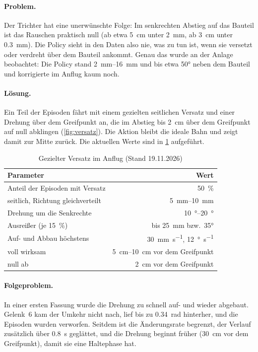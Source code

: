 \paragraph{Problem.} Der Trichter hat eine unerwünschte Folge: Im senkrechten Abstieg auf das
Bauteil ist das Rauschen praktisch null (ab etwa \SI{5}{\centi\metre} unter
\SI{2}{\milli\metre}, ab \SI{3}{\centi\metre} unter \SI{0.3}{\milli\metre}). Die Policy sieht
in den Daten also nie, was zu tun ist, wenn sie versetzt oder verdreht über dem Bauteil
ankommt. Genau das wurde an der Anlage beobachtet: Die Policy stand \SIrange{2}{16}{\milli\metre}
und bis etwa \ang{50} neben dem Bauteil und korrigierte im Anflug kaum noch.

\paragraph{Lösung.} Ein Teil der Episoden fährt mit einem gezielten seitlichen Versatz und
einer Drehung über dem Greifpunkt an, die im Abstieg bis \SI{2}{\centi\metre} über dem
Greifpunkt auf null abklingen (\cref{fig:versatz}). Die Aktion bleibt die ideale Bahn und
zeigt damit zur Mitte zurück. Die aktuellen Werte sind in \cref{tab:versatz} aufgeführt.

\begin{table}[htbp]
  \centering
  \caption[Gezielter Versatz im Anflug]{Gezielter Versatz im Anflug (Stand 19.11.2026)}
  \label{tab:versatz}
  \begin{tabular}{@{}l r@{}}
    \toprule
    Parameter & Wert \\
    \midrule
    Anteil der Episoden mit Versatz & \SI{50}{\percent} \\
    seitlich, Richtung gleichverteilt & \SIrange{5}{10}{\milli\metre} \\
    Drehung um die Senkrechte & \SIrange{10}{20}{\degree} \\
    Ausreißer (je \SI{15}{\percent}) & bis \SI{25}{\milli\metre} bzw.\ \ang{35} \\
    Auf- und Abbau höchstens & \SI{30}{\milli\metre\per\second}, \SI{12}{\degree\per\second} \\
    voll wirksam & \SIrange{5}{10}{\centi\metre} vor dem Greifpunkt \\
    null ab & \SI{2}{\centi\metre} vor dem Greifpunkt \\
    \bottomrule
  \end{tabular}
\end{table}

\paragraph{Folgeproblem.} In einer ersten Fassung wurde die Drehung zu schnell auf- und
wieder abgebaut. Gelenk~6 kam der Umkehr nicht nach, lief bis zu \SI{0.34}{rad} hinterher, und
die Episoden wurden verworfen. Seitdem ist die Änderungsrate begrenzt, der Verlauf zusätzlich
über \SI{0.8}{\second} geglättet, und die Drehung beginnt früher (\SI{30}{\centi\metre} vor
dem Greifpunkt), damit sie eine Haltephase hat.

